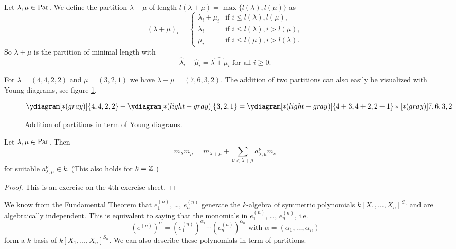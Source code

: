 \begin{defi}
 Let $\lambda, \mu \in \operatorname{Par}$. We define the partition $\lambda+\mu$ of length $l(\lambda+\mu) = \max\{ l(\lambda), l(\mu) \}$ as
 \[
  (\lambda+\mu)_i =
  \begin{cases}
   \lambda_i + \mu_i & \text{if } i \leq l(\lambda),l(\mu), \\
   \lambda_i         & \text{if } i \leq l(\lambda), i > l(\mu), \\
   \mu_i             & \text{if } i \leq l(\mu), i > l(\lambda).
  \end{cases}
 \]
 So $\lambda+\mu$ is the partition of minimal length with
 \[
  \hat{\lambda}_i + \hat{\mu}_i = \widehat{\lambda+\mu}_i \text{ for all } i \geq 0.
 \]
\end{defi}


\begin{expl}
 For $\lambda = (4,4,2,2)$ and $\mu = (3,2,1)$ we have $\lambda+\mu = (7,6,3,2)$. The addition of two partitions can also easily be visualized with Young diagrams, see figure \ref{fig: addition partition young diagrams}.
 \begin{figure}\centering
  \[
   \ydiagram[*(gray)]{4,4,2,2} + \ydiagram[*(light-gray)]{3,2,1}
   = \ydiagram[*(light-gray)] {4+3,4+2,2+1} *[*(gray)]{7,6,3,2}
  \]
  \caption{Addition of partitions in term of Young diagrams.}
  \label{fig: addition partition young diagrams}
 \end{figure}
\end{expl}


\begin{lem}
 Let $\lambda, \mu \in \operatorname{Par}$. Then
 \[
  m_{\lambda} m_{\mu} = m_{\lambda + \mu} + \sum_{\nu < \lambda + \mu} a^\nu_{\lambda,\mu} m_\nu
 \]
 for suitable $a^\nu_{\lambda,\mu} \in k$. (This also holds for $k = \mathbb{Z}$.)
\end{lem}
\begin{proof}
 This is an exercise on the 4th exercise sheet.
\end{proof}


We know from the Fundamental Theorem that $e^{(n)}_1$, \dots, $e^{(n)}_n$ generate the $k$-algebra of symmetric polynomials $k[X_1, \dotsc, X_n]^{S_n}$ and are algebraically independent. This is equivalent to saying that the monomials in $e^{(n)}_1$, \dots, $e^{(n)}_n$, i.e.
\[
 \left( e^{(n)} \right)^\alpha = \left(e^{(n)}_1\right)^{\alpha_1} \dotsm \left(e^{(n)}_n\right)^{\alpha_n} \text{ with } \alpha = (\alpha_1, \dotsc, \alpha_n)
\]
form a $k$-basis of $k[X_1, \dotsc, X_n]^{S_n}$. We can also describe these polynomials in term of partitions.


